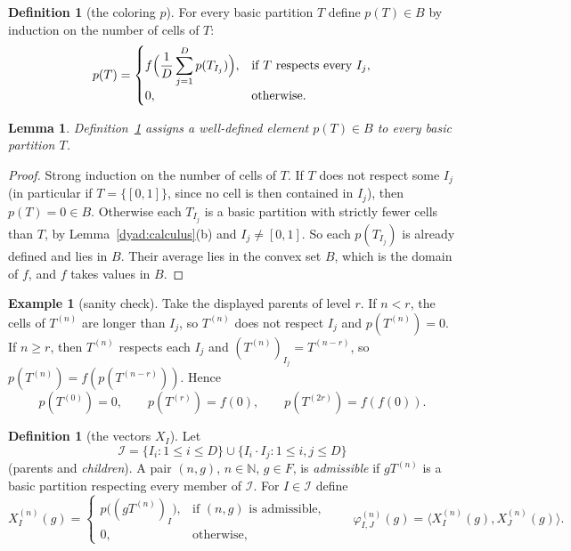 \documentclass[11pt]{article}
\newcommand{\N}{\mathbb N}
\newcommand{\ip}[2]{\langle #1,#2\rangle}
\newcommand{\cI}{\mathcal I}
\newtheorem{lemma}[theorem]{Lemma}
\theoremstyle{definition}
\newtheorem{definition}[theorem]{Definition}
\newtheorem{example}[theorem]{Example}
\numberwithin{equation}{section}
\begin{document}
\begin{definition}[the coloring \(p\)]\label{color:def}
For every basic partition \(T\) define \(p(T)\in B\) by induction on the
number of cells of \(T\):
\begin{equation}\label{color:recursion}
  p(T)=
  \begin{cases}
  \displaystyle f\Bigl(\frac1D\sum_{j=1}^D p(T_{I_j})\Bigr),
       &\text{if \(T\) respects every \(I_j\)},\\[6pt]
  0,   &\text{otherwise}.
  \end{cases}
\end{equation}
\end{definition}

\begin{lemma}\label{color:welldefined}
Definition~\ref{color:def} assigns a well-defined element \(p(T)\in B\)
to every basic partition \(T\).
\end{lemma}

\begin{proof}
Strong induction on the number of cells of \(T\). If \(T\) does not
respect some \(I_j\) (in particular if \(T=\{[0,1]\}\), since no cell is
then contained in \(I_j\)), then \(p(T)=0\in B\). Otherwise each
\(T_{I_j}\) is a basic partition with strictly fewer cells than \(T\), by
Lemma~\ref{dyad:calculus}(b) and \(I_j\ne[0,1]\). So each \(p(T_{I_j})\)
is already defined and lies in \(B\). Their average lies in the convex
set \(B\), which is the domain of \(f\), and \(f\) takes values in \(B\).
\end{proof}

\begin{example}[sanity check]\label{color:example}
Take the displayed parents of level \(r\). If \(n<r\), the cells of
\(T^{(n)}\) are longer than \(I_j\), so \(T^{(n)}\) does not respect
\(I_j\) and \(p(T^{(n)})=0\). If \(n\ge r\), then \(T^{(n)}\) respects
each \(I_j\) and \((T^{(n)})_{I_j}=T^{(n-r)}\), so
\(p(T^{(n)})=f(p(T^{(n-r)}))\). Hence
\[
  p(T^{(0)})=0,\qquad p(T^{(r)})=f(0),\qquad p(T^{(2r)})=f(f(0)).
\]
\end{example}

\begin{definition}[the vectors \(X_I\)]\label{color:global-def}
Let
\[
  \cI=\{I_i:1\le i\le D\}\cup\{I_i\cdot I_j:1\le i,j\le D\}
\]
(parents and \emph{children}). A pair \((n,g)\), \(n\in\N\), \(g\in F\),
is \emph{admissible} if \(gT^{(n)}\) is a basic partition respecting
every member of \(\cI\). For \(I\in\cI\) define
\begin{equation}\label{color:global}
  X_I^{(n)}(g)=
  \begin{cases}
    p\bigl((gT^{(n)})_I\bigr),&\text{if \((n,g)\) is admissible},\\
    0,&\text{otherwise},
  \end{cases}
  \qquad
  \varphi_{I,J}^{(n)}(g)=\ip{X_I^{(n)}(g)}{X_J^{(n)}(g)} .
\end{equation}
\end{definition}
\end{document}
